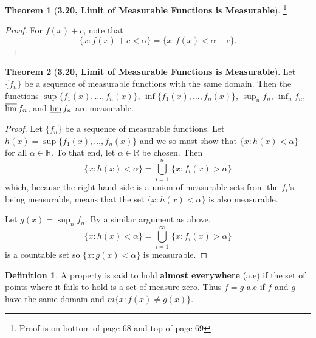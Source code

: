 \documentclass[12pt]{article}
\newcommand{\R}{\mathbb{R}}
\theoremstyle{definition}
\newtheorem*{thm}{Theorem}
\newtheorem*{definition}{Definition}
\begin{document}
\begin{thm}[\textbf{3.20, Limit of Measurable Functions is Measurable}]\footnote{Proof is on bottom of page 68 and top of page 69}
        \begin{proof}
            For \( f(x) + c \), note that 
                \[
                    \{ x: f(x) + c < \alpha \} = \{ x: f(x) < \alpha - c \}.    
                \]
        \end{proof}
\end{thm}

\begin{thm}[\textbf{3.20, Limit of Measurable Functions is Measurable}]


    Let \( \{ f_n \} \) be a sequence of measurable functions with the same domain. Then the functions \( \sup\{f_1(x), \ldots, f_n(x) \} \), \( \inf \{ f_1(x), \ldots, f_n(x)\}\), \( \sup_{n} f_n \), \( \inf_{n} f_n \), \( \varlimsup f_n \), and \( \varliminf f_n \) are measurable. 

        \begin{proof}
            Let \( \{ f_n\} \) be a sequence of measurable functions. Let \( h(x) = \sup\{f_1(x), \ldots, f_n(x) \} \) and we so must show that \( \{ x: h(x) < \alpha \}\) for all \( \alpha \in \R \). To that end, let \( \alpha \in \R \) be chosen. Then 
                \[
                     \{ x: h(x) < \alpha \} = \bigcup_{i=1}^{n} \, \{ x: f_i(x) > \alpha \}
                \]
            which, because the right-hand side is a union of measurable sets from the \( f_i \)'s being measurable, means that the set \( \{ x: h(x) < \alpha \}\)  is also measurable.

            Let \( g(x) = \sup_{n} f_n \). By a similar argument as above, 
                \[
                    \{ x: h(x) < \alpha \} = \bigcup_{i=1}^{\infty} \, \{ x: f_i(x) > \alpha \}  
                \]
            is a countable set so \( \{ x: g(x) < \alpha \}\) is measurable. 
        \end{proof}
\end{thm}

\begin{definition}
    A property is said to hold \textbf{almost everywhere} (a.e) if the set of points where it fails to hold is a set of measure zero. Thus \(f = g\) a.e if \( f \) and \( g \) have the same domain and \( m \{ x: f(x) \neq g(x) \} \). 
\end{definition}
\end{document}
